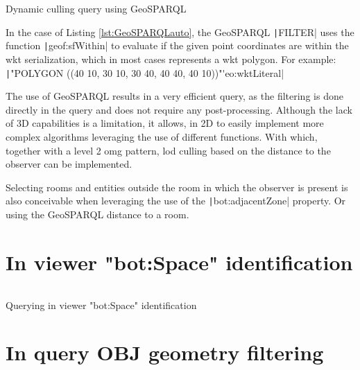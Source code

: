 \begin{listing}[H]
    \inputminted{sparql}{dynamicQueries/inSitu/query.rq}
    \vspace{-0.7cm}
    \caption{Dynamic culling query using GeoSPARQL}
    \label{lst:GeoSPARQLauto}
\end{listing}

In the case of Listing \ref{lst:GeoSPARQLauto}, the GeoSPARQL \texttt|FILTER| uses the function \texttt|geof:sfWithin| to evaluate if the given point coordinates are within the \ac{wkt} serialization, which in most cases represents a \ac{wkt} polygon. For example:\\
\texttt|"POLYGON ((40 10, 30 10, 30 40, 40 40, 40 10))"^^geo:wktLiteral|

The use of GeoSPARQL results in a very efficient query, as the filtering is done directly in the query and does not require any post-processing. Although the lack of 3D capabilities is a limitation, it allows, in 2D to easily implement more complex algorithms leveraging the use of different functions. With which, together with a level 2 \ac{omg} pattern, \ac{lod} culling based on the distance to the observer can be implemented. 

Selecting rooms and entities outside the room in which the observer is present is also conceivable when leveraging the use of the \texttt|bot:adjacentZone| property. Or using the GeoSPARQL distance to a room.

\section{In viewer "bot:Space" identification}

\begin{listing}[H]
    \inputminted{sparql}{dynamicQueries/inViewer/query.rq}
    \vspace{-0.7cm}
    \caption{Querying in viewer "bot:Space" identification}
    \label{lst:BOTauto}
\end{listing}


\section{In query OBJ geometry filtering}

